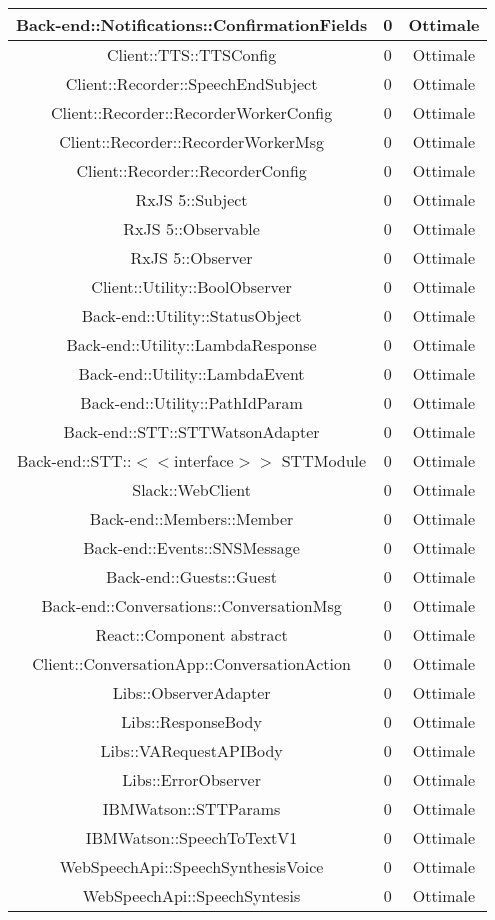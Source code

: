 \begin{longtable}{|c|c|c|}
\hline Back-end::Notifications::ConfirmationFields & 0 & Ottimale \\
\hline Client::TTS::TTSConfig & 0 & Ottimale \\
\hline Client::Recorder::SpeechEndSubject & 0 & Ottimale \\
\hline Client::Recorder::RecorderWorkerConfig & 0 & Ottimale \\
\hline Client::Recorder::RecorderWorkerMsg & 0 & Ottimale \\
\hline Client::Recorder::RecorderConfig & 0 & Ottimale \\
\hline RxJS 5::Subject & 0 & Ottimale \\
\hline RxJS 5::Observable & 0 & Ottimale \\
\hline RxJS 5::Observer & 0 & Ottimale \\
\hline Client::Utility::BoolObserver & 0 & Ottimale \\
\hline Back-end::Utility::StatusObject & 0 & Ottimale \\
\hline Back-end::Utility::LambdaResponse & 0 & Ottimale \\
\hline Back-end::Utility::LambdaEvent & 0 & Ottimale \\
\hline Back-end::Utility::PathIdParam & 0 & Ottimale \\
\hline Back-end::STT::STTWatsonAdapter & 0 & Ottimale \\
\hline Back-end::STT::$<$$<$interface$>$$>$ STTModule & 0 & Ottimale \\
\hline Slack::WebClient & 0 & Ottimale \\
\hline Back-end::Members::Member & 0 & Ottimale \\
\hline Back-end::Events::SNSMessage & 0 & Ottimale \\
\hline Back-end::Guests::Guest & 0 & Ottimale \\
\hline Back-end::Conversations::ConversationMsg & 0 & Ottimale \\
\hline React::Component {abstract} & 0 & Ottimale \\
\hline Client::ConversationApp::ConversationAction & 0 & Ottimale \\
\hline Libs::ObserverAdapter & 0 & Ottimale \\
\hline Libs::ResponseBody & 0 & Ottimale \\
\hline Libs::VARequestAPIBody & 0 & Ottimale \\
\hline Libs::ErrorObserver & 0 & Ottimale \\
\hline IBMWatson::STTParams & 0 & Ottimale \\
\hline IBMWatson::SpeechToTextV1 & 0 & Ottimale \\
\hline WebSpeechApi::SpeechSynthesisVoice & 0 & Ottimale \\
\hline WebSpeechApi::SpeechSyntesis & 0 & Ottimale \\
\hline \end{longtable}
